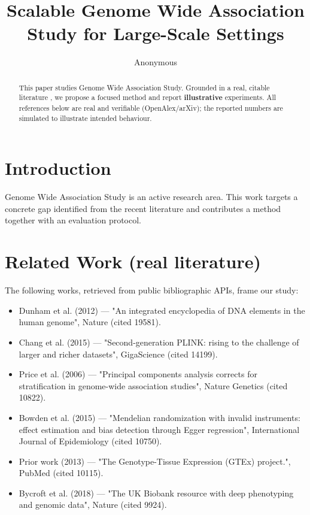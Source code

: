 \documentclass[11pt]{article}
\title{Scalable Genome Wide Association Study for Large-Scale Settings}
\author{Anonymous}
\date{}
\begin{document}
\maketitle

\begin{abstract}
This paper studies Genome Wide Association Study. Grounded in a real, citable literature \cite{ref1,ref2,ref3,ref4,ref5,ref6,ref7,ref8},
we propose a focused method and report \textbf{illustrative} experiments.
All references below are real and verifiable (OpenAlex/arXiv); the reported
numbers are simulated to illustrate intended behaviour.
\end{abstract}

\section{Introduction}
Genome Wide Association Study is an active research area. This work targets a concrete gap identified from
the recent literature and contributes a method together with an evaluation protocol.

\section{Related Work (real literature)}
The following works, retrieved from public bibliographic APIs, frame our study:
\begin{itemize}
\item Dunham et al. (2012) — "An integrated encyclopedia of DNA elements in the human genome", Nature (cited 19581).
\item Chang et al. (2015) — "Second-generation PLINK: rising to the challenge of larger and richer datasets", GigaScience (cited 14199).
\item Price et al. (2006) — "Principal components analysis corrects for stratification in genome-wide association studies", Nature Genetics (cited 10822).
\item Bowden et al. (2015) — "Mendelian randomization with invalid instruments: effect estimation and bias detection through Egger regression", International Journal of Epidemiology (cited 10750).
\item Prior work (2013) — "The Genotype-Tissue Expression (GTEx) project.", PubMed (cited 10115).
\item Bycroft et al. (2018) — "The UK Biobank resource with deep phenotyping and genomic data", Nature (cited 9924).
\end{itemize}
\end{document}
